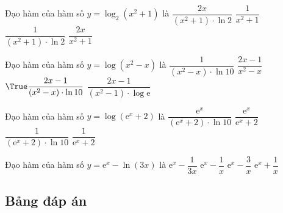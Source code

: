 \begin{ex}%
	Đạo hàm của hàm số $y=\log_2\left(x^2+1\right)$ là
	\choice
	{\True $\dfrac{2x}{\left(x^2+1\right)\cdot\ln 2}$}
	{$\dfrac{1}{x^2+1}$}
	{$\dfrac{1}{\left(x^2+1\right)\cdot\ln 2}$}
	{$\dfrac{2x}{x^2+1}$}
\end{ex}

\begin{ex}%
	Đạo hàm của hàm số $y=\log\left(x^2-x\right)$ là
	\choice
	{$\dfrac{1}{\left(x^2-x\right)\cdot\ln 10}$}
	{$\dfrac{2x-1}{x^2-x}$}
	{$\True \dfrac{2x-1}{\left(x^2-x\right)\cdot\ln 10}$}
	{$\dfrac{2x-1}{\left(x^2-1\right)\cdot\log\mathrm{e}}$}
\end{ex}

\begin{ex}%
	Đạo hàm của hàm số $y=\log\left(\mathrm{e}^x+2\right)$ là
	\choice
	{\True $\dfrac{\mathrm{e}^x}{\left(\mathrm{e}^x+2\right)\cdot\ln 10}$}
	{$\dfrac{\mathrm{e}^x}{\mathrm{e}^x+2}$}
	{$\dfrac{1}{\left(\mathrm{e}^x+2\right)\cdot\ln 10}$}
	{$\dfrac{1}{\mathrm{e}^x+2}$}
\end{ex}

\begin{ex}%
	Đạo hàm của hàm số $y=\mathrm{e}^x-\ln\left(3x\right)$ là
	\choice
	{$\mathrm{e}^x-\dfrac{1}{3x}$}
	{\True $\mathrm{e}^x-\dfrac{1}{x}$}
	{$\mathrm{e}^x-\dfrac{3}{x}$}
	{$\mathrm{e}^x+\dfrac{1}{x}$}
\end{ex}
\subsection{Bảng đáp án}

